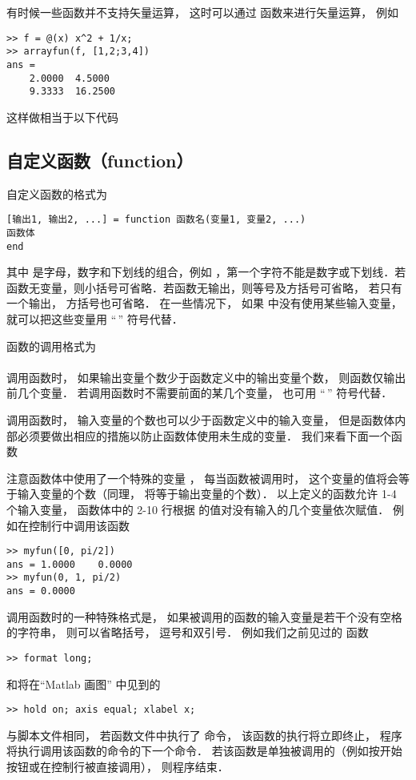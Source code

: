 有时候一些函数并不支持矢量运算， 这时可以通过  函数来进行矢量运算， 例如
\begin{lstlisting}[language=MatlabCom]
>> f = @(x) x^2 + 1/x;
>> arrayfun(f, [1,2;3,4])
ans =
    2.0000  4.5000
    9.3333  16.2500
\end{lstlisting}
这样做相当于以下代码


\subsection{自定义函数（function）}
自定义函数的格式为
\begin{lstlisting}[language=MatlabCom]
[输出1, 输出2, ...] = function 函数名(变量1, 变量2, ...)
函数体
end
\end{lstlisting}

其中  是字母，数字和下划线的组合，例如 ，第一个字符不能是数字或下划线．若函数无变量，则小括号可省略．若函数无输出，则等号及方括号可省略， 若只有一个输出， 方括号也可省略． 在一些情况下， 如果  中没有使用某些输入变量， 就可以把这些变量用 “\;\,\x{\~}” 符号代替．

函数的调用格式为\\
\\
调用函数时， 如果输出变量个数少于函数定义中的输出变量个数， 则函数仅输出前几个变量． 若调用函数时不需要前面的某几个变量， 也可用 “\;\,\x{\~}” 符号代替．

调用函数时， 输入变量的个数也可以少于函数定义中的输入变量， 但是函数体内部必须要做出相应的措施以防止函数体使用未生成的变量． 我们来看下面一个函数


注意函数体中使用了一个特殊的变量 ， 每当函数被调用时， 这个变量的值将会等于输入变量的个数（同理，  将等于输出变量的个数）． 以上定义的函数允许 1-4 个输入变量， 函数体中的 2-10 行根据  的值对没有输入的几个变量依次赋值． 例如在控制行中调用该函数
\begin{lstlisting}[language=MatlabCom]
>> myfun([0, pi/2])
ans = 1.0000    0.0000
>> myfun(0, 1, pi/2)
ans = 0.0000
\end{lstlisting}

调用函数时的一种特殊格式是， 如果被调用的函数的输入变量是若干个没有空格的字符串， 则可以省略括号， 逗号和双引号． 例如我们之前见过的  函数
\begin{lstlisting}[language=MatlabCom]
>> format long;
\end{lstlisting}
和将在“Matlab 画图” 中见到的
\begin{lstlisting}[language=MatlabCom]
>> hold on; axis equal; xlabel x;
\end{lstlisting}

与脚本文件相同， 若函数文件中执行了  命令， 该函数的执行将立即终止， 程序将执行调用该函数的命令的下一个命令． 若该函数是单独被调用的（例如按开始按钮或在控制行被直接调用）， 则程序结束．
